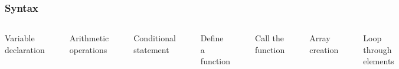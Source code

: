 \documentclass[aspectratio=169]{beamer} %
\begin{document}
\begin{frame}[fragile]
  \frametitle{Syntax}
  
  \begin{columns}[t]
  Variable declaration
  \begin{verbatim}
  a = 10
  b = 20
\end{verbatim}

Arithmetic operations
\begin{verbatim}
  sum = a + b
  product = a * b
\end{verbatim}
Conditional statement
\begin{verbatim}
  age = 25
  if age >= 18
    println("You're an adult.")
  else
    println("You're a minor.")
  end
  \end{verbatim}
  
  Define a function
  \begin{verbatim}
  function greet(name)
    println("Hello ", name)
  end
\end{verbatim}
Call the function
\begin{verbatim}
  greet("Julia")
\end{verbatim}
Array creation
\begin{verbatim}
  numbers = [1, 2, 3, 4, 5]
\end{verbatim}
Loop through elements  
\begin{verbatim}
  for num in numbers
    println(num)
  end
  \end{verbatim}
  \end{columns}
  
  \end{frame}
\end{document}
